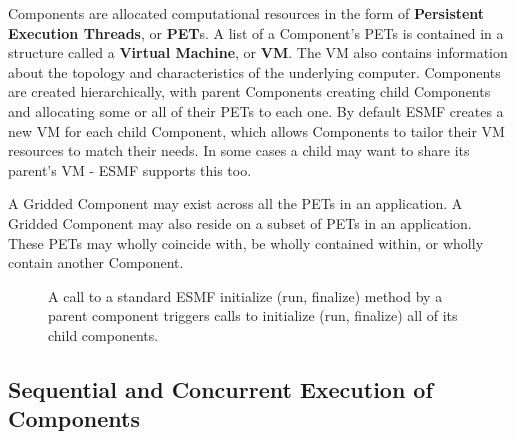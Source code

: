 Components are allocated computational resources in the form of
{\bf Persistent Execution Threads}, or {\bf PET}s.  A list of a Component's
PETs is contained in a structure called a {\bf Virtual Machine},
or {\bf VM}.  The VM also contains information about the topology and
characteristics of the underlying computer.
Components are created hierarchically, with parent Components creating
child Components and allocating some or all of their PETs to each one.
By default ESMF creates a new VM for each child Component, which 
allows Components to tailor their VM resources to match their needs.
In some cases a child may want to share its parent's VM - ESMF
supports this too.

A Gridded Component may exist across all the PETs in an application. 
A Gridded Component may also reside on a subset of PETs in an
application.  These PETs may wholly coincide with, be wholly contained
within, or wholly contain another Component.

\begin{center}
\begin{figure}
\caption{A call to a standard ESMF initialize (run, finalize) method
by a parent component triggers calls to initialize (run, finalize)
all of its child components.}
\label{fig:appunit}
\end{figure}
\end{center}

\subsection{Sequential and Concurrent Execution of Components}
\label{sec:concurrency}

